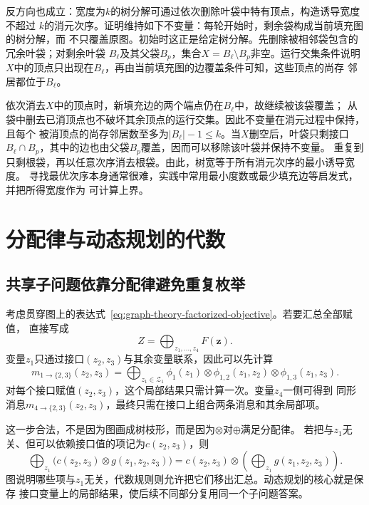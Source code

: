反方向也成立：宽度为\(k\)的树分解可通过依次删除叶袋中特有顶点，构造诱导宽度不超过
\(k\)的消元次序。证明维持如下不变量：每轮开始时，剩余袋构成当前填充图的树分解，而
不只覆盖原图。初始时这正是给定树分解。先删除被相邻袋包含的冗余叶袋；对剩余叶袋
\(B_\ell\)及其父袋\(B_p\)，集合\(X=B_\ell\setminus B_p\)非空。运行交集条件说明
\(X\)中的顶点只出现在\(B_\ell\)，再由当前填充图的边覆盖条件可知，这些顶点的尚存
邻居都位于\(B_\ell\)。

依次消去\(X\)中的顶点时，新填充边的两个端点仍在\(B_\ell\)中，故继续被该袋覆盖；
从袋中删去已消顶点也不破坏其余顶点的运行交集。因此不变量在消元过程中保持，且每个
被消顶点的尚存邻居数至多为\(|B_\ell|-1\leq k\)。当\(X\)删空后，叶袋只剩接口
\(B_\ell\cap B_p\)，其中的边也由父袋\(B_p\)覆盖，因而可以移除该叶袋并保持不变量。
重复到只剩根袋，再以任意次序消去根袋。由此，树宽等于所有消元次序的最小诱导宽度。
寻找最优次序本身通常很难，实践中常用最小度数或最少填充边等启发式，并把所得宽度作为
可计算上界。

\section{分配律与动态规划的代数}
\label{sec:graph-theory-semiring-dynamic-programming}

\subsection{共享子问题依靠分配律避免重复枚举}

考虑贯穿图上的表达式~\eqref{eq:graph-theory-factorized-objective}。若要汇总全部赋值，
直接写成
\[
  Z=\bigoplus_{z_1,\ldots,z_4}F(\bm{z}).
\]
变量\(z_1\)只通过接口\((z_2,z_3)\)与其余变量联系，因此可以先计算
\begin{equation}
  m_{1\to\{2,3\}}(z_2,z_3)=
  \bigoplus_{z_1\in\mathcal{Z}_1}
  \phi_1(z_1)\otimes
  \phi_{1,2}(z_1,z_2)\otimes\phi_{1,3}(z_1,z_3).
  \label{eq:graph-theory-interface-message}
\end{equation}
对每个接口赋值\((z_2,z_3)\)，这个局部结果只需计算一次。变量\(z_4\)一侧可得到
同形消息\(m_{4\to\{2,3\}}(z_2,z_3)\)，最终只需在接口上组合两条消息和其余局部项。

这一步合法，不是因为图画成树枝形，而是因为\(\otimes\)对\(\oplus\)满足分配律。
若把与\(z_1\)无关、但可以依赖接口值的项记为\(c(z_2,z_3)\)，则
\[
  \bigoplus_{z_1}\bigl(c(z_2,z_3)\otimes g(z_1,z_2,z_3)\bigr)
  =c(z_2,z_3)\otimes\left(\bigoplus_{z_1}g(z_1,z_2,z_3)\right).
\]
图说明哪些项与\(z_1\)无关，代数规则则允许把它们移出汇总。动态规划的核心就是保存
接口变量上的局部结果，使后续不同部分复用同一个子问题答案。

